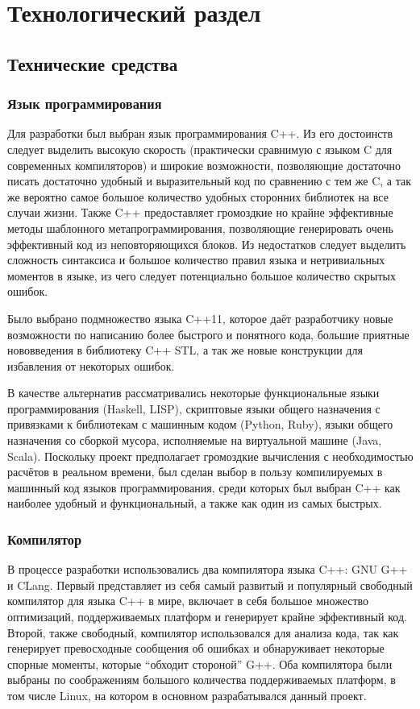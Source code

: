 \documentclass[a4paper,12pt]{report}
\numberwithin{equation}{section}
\begin{document}

\section{Технологический раздел}

\subsection{Технические средства}

\subsubsection{Язык программирования}
Для разработки был выбран язык программирования C++. Из его достоинств следует выделить высокую скорость (практически сравнимую с языком C для современных компиляторов) и широкие возможности, позволяющие достаточно писать достаточно удобный и выразительный код по сравнению с тем же C, а так же вероятно самое большое количество удобных сторонних библиотек на все случаи жизни. Также C++ предоставляет громоздкие но крайне эффективные методы шаблонного метапрограммирования, позволяющие генерировать очень эффективный код из неповторяющихся блоков. Из недостатков следует выделить сложность синтаксиса и большое количество правил языка и нетривиальных моментов в языке, из чего следует потенциально большое количество скрытых ошибок.

Было выбрано подмножество языка C++11, которое даёт разработчику новые возможности по написанию более быстрого и понятного кода, большие приятные нововведения в библиотеку C++ STL, а так же новые конструкции для избавления от некоторых ошибок.

В качестве альтернатив рассматривались некоторые функциональные языки программирования (Haskell, LISP), скриптовые языки общего назначения с привязками к библиотекам с машинным кодом (Python, Ruby), языки общего назначения со сборкой мусора, исполняемые на виртуальной машине (Java, Scala). Поскольку проект предполагает громоздкие вычисления с необходимостью расчётов в реальном времени, был сделан выбор в пользу компилируемых в машинный код языков программирования, среди которых был выбран C++ как наиболее удобный и функциональный, а также как один из самых быстрых.

\subsubsection{Компилятор}
В процессе разработки использовались два компилятора языка C++: GNU G++ и CLang. Первый представляет из себя самый развитый и популярный свободный компилятор для языка C++ в мире, включает в себя большое множество оптимизаций, поддерживаемых платформ и генерирует крайне эффективный код. Второй, также свободный, компилятор использовался для анализа кода, так как генерирует превосходные сообщения об ошибках и обнаруживает некоторые спорные моменты, которые ``обходит стороной'' G++. Оба компилятора были выбраны по соображениям большого количества поддерживаемых платформ, в том числе Linux, на котором в основном разрабатывался данный проект.
\end{document}
